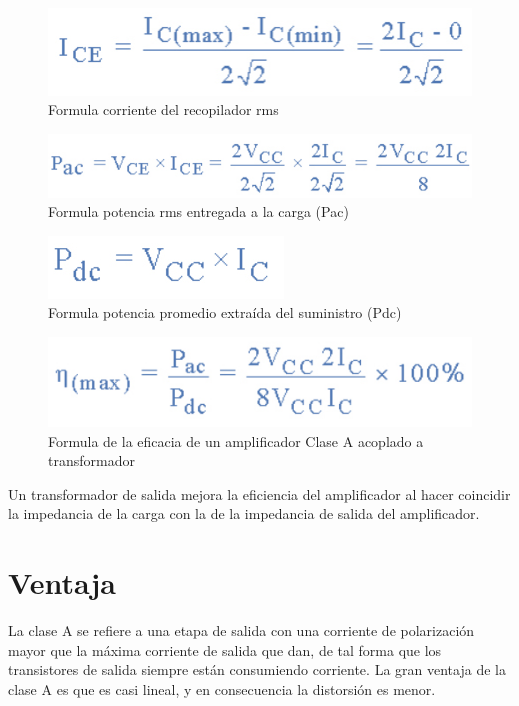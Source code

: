 \documentclass[12pt,a4paper]{article}
\begin{document}
\begin{figure}[hbtp]
\centering
\includegraphics[scale=0.7]{Circuitos/9.png}
\caption{Formula corriente del recopilador rms}
\end{figure}

\begin{figure}[hbtp]
\centering
\includegraphics[scale=0.7]{Circuitos/10.png}
\caption{Formula potencia rms entregada a la carga (Pac)}
\end{figure}

\begin{figure}[hbtp]
\centering
\includegraphics[scale=1]{Circuitos/11.PNG}
\caption{Formula potencia promedio extraída del suministro (Pdc)}
\end{figure}

\begin{figure}[hbtp]
\centering
\includegraphics[scale=1]{Circuitos/12.PNG}
\caption{Formula de la eficacia de un amplificador Clase A acoplado a transformador}
\end{figure}

\newpage
Un transformador de salida mejora la eficiencia del amplificador al hacer coincidir la impedancia de la carga con la de la impedancia de salida del amplificador. 

\section{Ventaja}
La clase A se refiere a una etapa de salida con una corriente de polarización mayor que la máxima corriente de salida que dan, de tal forma que los transistores de salida siempre están consumiendo corriente. La gran ventaja de la clase A es que es casi lineal, y en consecuencia la distorsión es menor.
\end{document}
